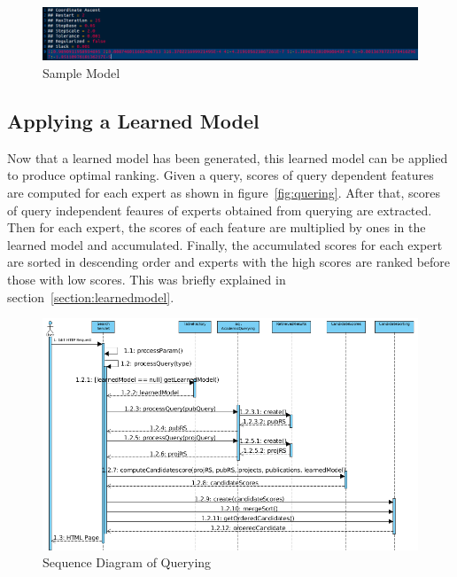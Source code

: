 \begin{figure}
\centering
\includegraphics[scale=0.3]{./figures/samplemodel.png}
\caption{Sample Model} \label{fig:samplemodel} 
\end{figure}

\subsection{Applying a Learned Model}\label{section:applyinglearnedmodel}
Now that a learned model has been generated, this learned model can be applied to produce optimal ranking. Given a query,
scores of query dependent features are computed for each expert as shown in figure~\ref{fig:quering}. After that, scores of query independent feaures
of experts obtained from querying are extracted. Then for each expert, the scores of each feature are multiplied by ones in the learned model and accumulated.
Finally, the accumulated scores for each expert are sorted in descending order and experts with the high scores are ranked before those with low scores. 
This was briefly explained in section~\ref{section:learnedmodel}.



\begin{figure}
\centering
\includegraphics[scale=0.5]{./figures/searchsequence.png}
\caption{Sequence Diagram of Querying} \label{fig:searchsequence} 
\end{figure}

